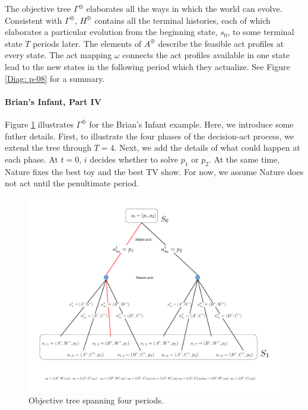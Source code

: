 \documentclass[
11pt,
titlepage,
reqno,
]{article}%
\theoremstyle{definition}
\begin{document}
The objective tree $\Gamma^\oplus$ elaborates all the ways in which the world can evolve.
Consistent with $\Gamma^\oplus$, $H^\oplus$ contains all the terminal histories, each of which elaborates a particular evolution from the beginning state, $s_0$, to some terminal state $T$ periods later.
The elements of $A^\oplus$ describe the feasible act profiles at every state.
The act mapping $\omega$ connects the act profiles available in one state lead to the new states in the following period which they actualize.
See Figure \ref{Diag: p-08} for a summary.



\paragraph{Brian's Infant, Part IV}
Figure \ref{Diag: p-04} illustrates $\Gamma^\oplus$ for the Brian's Infant example. 
Here, we introduce some futher details.
First, to illustrate the four phases of the decision-act process, we extend the tree through $T=4$.
Next, we add the details of what could happen at each phase.
At $t=0$, $i$ decides whether to solve $p_1$ or $p_2$.
At the same time, Nature fixes the best toy and the best TV show. 
For now, we assume Nature does not act until the penultimate period.

\begin{figure}[h!]
	\centering
	\includegraphics*[page=4,trim = 0in 0in 0in 0in,scale=.65]{Awareness_Diagrams_All}
	\caption{Objective tree spanning four periods.\label{Diag: p-04}}%
\end{figure}
\end{document}
